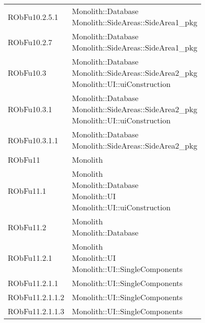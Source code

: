 \begin{center}
\begin{longtable}{|
*{1}{>{\centering\arraybackslash}m{2.5cm}|}
*{1}{>{\centering\arraybackslash}m{7.5cm}|}}
{\\}\\\hline
RObFu10.2.5.1 & \makecell[l]{Monolith::Database
\\Monolith::SideAreas::SideArea1\_pkg
\\}\\\hline
RObFu10.2.7 & \makecell[l]{Monolith::Database
\\Monolith::SideAreas::SideArea1\_pkg
\\}\\\hline
RObFu10.3 & \makecell[l]{Monolith::Database
\\Monolith::SideAreas::SideArea2\_pkg
\\Monolith::UI::uiConstruction
\\}\\\hline
RObFu10.3.1 & \makecell[l]{Monolith::Database
\\Monolith::SideAreas::SideArea2\_pkg
\\Monolith::UI::uiConstruction
\\}\\\hline
RObFu10.3.1.1 & \makecell[l]{Monolith::Database
\\Monolith::SideAreas::SideArea2\_pkg
\\}\\\hline
RObFu11 & \makecell[l]{Monolith
\\}\\\hline
RObFu11.1 & \makecell[l]{Monolith
\\Monolith::Database
\\Monolith::UI
\\Monolith::UI::uiConstruction
\\}\\\hline
RObFu11.2 & \makecell[l]{Monolith
\\Monolith::Database
\\}\\\hline
RObFu11.2.1 & \makecell[l]{Monolith
\\Monolith::UI
\\Monolith::UI::SingleComponents
\\}\\\hline
RObFu11.2.1.1 & \makecell[l]{Monolith::UI::SingleComponents
\\}\\\hline
RObFu11.2.1.1.2 & \makecell[l]{Monolith::UI::SingleComponents
\\}\\\hline
RObFu11.2.1.1.3 & \makecell[l]{Monolith::UI::SingleComponents
\\}\\\hline

\end{longtable}
\end{center}
